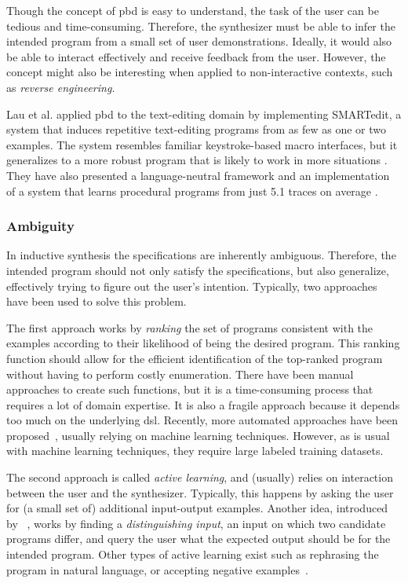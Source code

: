 Though the concept of \gls{pbd} is easy to understand, the task of the user can
be tedious and time-consuming. Therefore, the synthesizer must be able to infer
the intended program from a small set of user demonstrations.
Ideally, it would also be able to interact effectively and receive feedback from
the user.
However, the concept might also be interesting when applied to non-interactive
contexts, such as \textit{reverse engineering}.

Lau et al. applied \gls{pbd} to the text-editing domain by implementing
SMARTedit, a system that induces repetitive text-editing programs from as few as
one or two examples. The system resembles familiar keystroke-based macro
interfaces, but it generalizes to a more robust program that is likely to work
in more situations \cite{Lau2003}.
They have also presented a language-neutral framework and an implementation of a
system that learns procedural programs from just 5.1 traces on average
\cite{Lau:traces:2003}.

\subsubsection{Ambiguity}
\label{sec:ambiguity}

In inductive synthesis the specifications are inherently ambiguous.
Therefore, the intended program should not only satisfy the specifications,
but also generalize, effectively trying to figure out the user's intention.
Typically, two approaches have been used to solve this problem.

The first approach works by \textit{ranking} the set of programs consistent with
the examples according to their likelihood of being the desired program.
This ranking function should allow for the efficient identification of the
top-ranked program without having to perform costly enumeration.
There have been manual approaches to create such functions, but it is a
time-consuming process that requires a lot of domain expertise.
It is also a fragile approach because it depends too much on the underlying
\gls{dsl}.
Recently, more automated approaches have been proposed~\cite{Singh:ranking:2015,
  Ramsey:2017:LTL}, usually relying on machine learning techniques.
However, as is usual with machine learning techniques, they require large
labeled training datasets.

The second approach is called \textit{active learning}, and (usually) relies
on interaction between the user and the synthesizer.
Typically, this happens by asking the user for (a small set of) additional
input-output examples.
Another idea, introduced by \citeauthor{Jha:oracle:2010}~\cite{Jha:oracle:2010},
works by finding a \textit{distinguishing input}, an input on which two
candidate programs differ, and query the user what the expected output should be
for the intended program.
Other types of active learning exist such as rephrasing the program in natural
language, or accepting negative examples~\cite{Frankle:2016:EST}.


